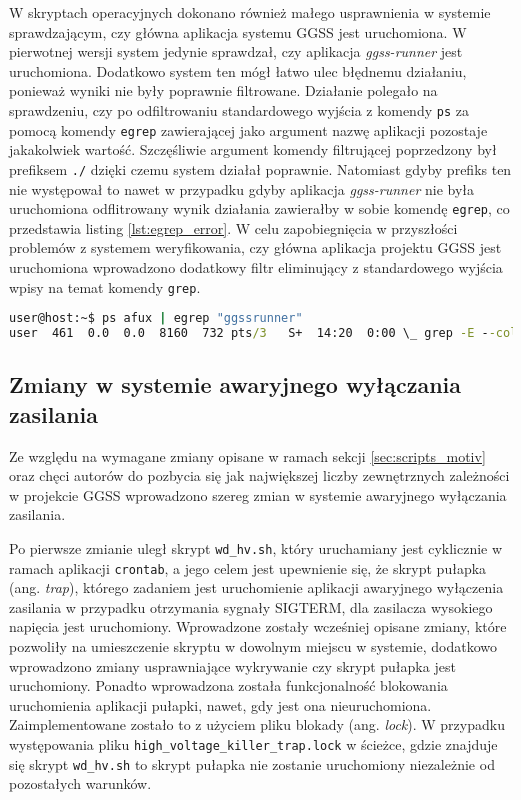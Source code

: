 W skryptach operacyjnych dokonano również małego usprawnienia w systemie sprawdzającym, czy główna aplikacja systemu GGSS jest uruchomiona. W pierwotnej wersji system jedynie sprawdzał, czy aplikacja \emph{ggss-runner} jest uruchomiona. Dodatkowo system ten mógł łatwo ulec błędnemu działaniu, ponieważ wyniki nie były poprawnie filtrowane. Działanie polegało na sprawdzeniu, czy po odfiltrowaniu standardowego wyjścia z komendy \lstinline{ps} za pomocą komendy \lstinline{egrep} zawierającej jako argument nazwę aplikacji pozostaje jakakolwiek wartość. Szczęśliwie argument komendy filtrującej poprzedzony był prefiksem \lstinline{./} dzięki czemu system działał poprawnie. Natomiast gdyby prefiks ten nie występował to nawet w przypadku gdyby aplikacja \emph{ggss-runner} nie była uruchomiona odflitrowany wynik działania zawierałby w sobie komendę \lstinline{egrep}, co przedstawia listing \ref{lst:egrep_error}. W celu zapobiegnięcia w przyszłości problemów z systemem weryfikowania, czy główna aplikacja projektu GGSS jest uruchomiona wprowadzono dodatkowy filtr eliminujący z standardowego wyjścia wpisy na temat komendy \lstinline{grep}.

\begin{lstlisting}[language=cmd,caption={Przykładowe działanie połączenie komend ps oraz egrep bez prefixu \lstinline{./} przy argumencie komendy egrep.},label={lst:egrep_error},frame=single]
user@host:~$ ps afux | egrep "ggssrunner"
user  461  0.0  0.0  8160  732 pts/3   S+  14:20  0:00 \_ grep -E --color=auto ggssrunner
\end{lstlisting}

\subsection{Zmiany w systemie awaryjnego wyłączania zasilania}

Ze względu na wymagane zmiany opisane w ramach sekcji \ref{sec:scripts_motiv} oraz chęci autorów do pozbycia się jak największej liczby zewnętrznych zależności w projekcie GGSS wprowadzono szereg zmian w systemie awaryjnego wyłączania zasilania.

Po pierwsze zmianie uległ skrypt \lstinline{wd_hv.sh}, który uruchamiany jest cyklicznie w ramach aplikacji \lstinline{crontab}, a jego celem jest upewnienie się, że skrypt pułapka (ang. \emph{trap}), którego zadaniem jest uruchomienie aplikacji awaryjnego wyłączenia zasilania w przypadku otrzymania sygnały SIGTERM, dla zasilacza wysokiego napięcia jest uruchomiony. Wprowadzone zostały wcześniej opisane zmiany, które pozwoliły na umieszczenie skryptu w dowolnym miejscu w systemie, dodatkowo wprowadzono zmiany usprawniające wykrywanie czy skrypt pułapka jest uruchomiony. Ponadto wprowadzona została funkcjonalność blokowania uruchomienia aplikacji pułapki, nawet, gdy jest ona nieuruchomiona. Zaimplementowane zostało to z użyciem pliku blokady (ang. \emph{lock}). W przypadku występowania pliku \lstinline{high_voltage_killer_trap.lock} w ścieżce, gdzie znajduje się skrypt \lstinline{wd_hv.sh} to skrypt pułapka nie zostanie uruchomiony niezależnie od pozostałych warunków.

